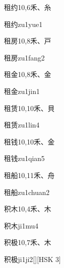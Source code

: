 \begin{entry}{租约}{10,6}{⽲、⽷}
  \begin{phonetics}{租约}{zu1yue1}
  \end{phonetics}
\end{entry}

\begin{entry}{租房}{10,8}{⽲、⼾}
  \begin{phonetics}{租房}{zu1fang2}
  \end{phonetics}
\end{entry}

\begin{entry}{租金}{10,8}{⽲、⾦}
  \begin{phonetics}{租金}{zu1jin1}
  \end{phonetics}
\end{entry}

\begin{entry}{租赁}{10,10}{⽲、⾙}
  \begin{phonetics}{租赁}{zu1lin4}
  \end{phonetics}
\end{entry}

\begin{entry}{租钱}{10,10}{⽲、⾦}
  \begin{phonetics}{租钱}{zu1qian5}
  \end{phonetics}
\end{entry}

\begin{entry}{租船}{10,11}{⽲、⾈}
  \begin{phonetics}{租船}{zu1chuan2}
  \end{phonetics}
\end{entry}

\begin{entry}{积木}{10,4}{⽲、⽊}
  \begin{phonetics}{积木}{ji1mu4}
  \end{phonetics}
\end{entry}

\begin{entry}{积极}{10,7}{⽲、⽊}
  \begin{phonetics}{积极}{ji1ji2}[][HSK 3]
  \end{phonetics}
\end{entry}


